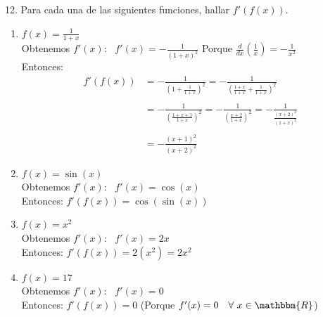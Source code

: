 \documentclass[12pt]{article}
\begin{document}
12. Para cada una de las siguientes funciones, hallar $f'(f(x))$.

\begin{enumerate}[\hspace{9px} a)]
    \item \(f(x)=\displaystyle\frac{1}{1+x}\)\\

        Obtenemos $f'(x)$: \ \(f'(x)=\displaystyle-\frac{1}{(1+x)^2}\) \qquad Porque \quad \(\displaystyle\frac{d}{dx}\left(\frac{1}{x}\right)=-\frac{1}{x^2}\)\\

        Entonces:
        \begin{align*}
            f'(f(x))&=\displaystyle-\frac{1}{\left(1+\displaystyle\frac{1}{1+x}\right)^2} = -\frac{1}{\left(\displaystyle\frac{1+x}{1+x}+\frac{1}{1+x}\right)^2} \\ \\
            &= -\frac{1}{\left(\displaystyle\frac{1+x+1}{1+x}\right)^2} = -\frac{1}{\left(\displaystyle\frac{x+2}{1+x}\right)^2} = -\frac{1}{\displaystyle\frac{(x+2)^2}{(1+x)^2}}\\ \\
            &= -\displaystyle\frac{(x+1)^2}{(x+2)^2}
        \end{align*}

    \item \(f(x)=\sin(x)\)\\

        Obtenemos $f'(x)$: \ \(f'(x)=\cos(x)\)\\

        Entonces: \quad \(f'(f(x))=\cos(\sin(x))\)

    \item \(f(x)=x^2\)\\

        Obtenemos $f'(x)$: \ \(f'(x)=2x\)\\

        Entonces: \quad \(f'(f(x))=2(x^2)=2x^2\)

    \item \(f(x)=17\)\\

        Obtenemos $f'(x)$: \ \(f'(x)=0\)\\

        Entonces: \quad \(f'(f(x))=0\) \qquad (Porque \(f'(x)=0 \quad \forall \ x \in \mathbbm{R}\))\\

\end{enumerate}
\end{document}
